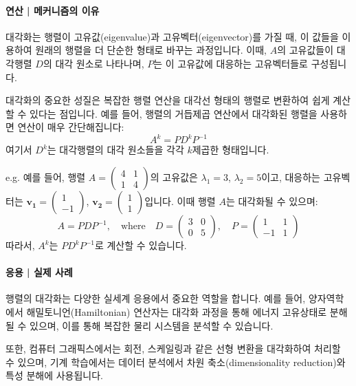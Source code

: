 \paragraph{연산 | 메커니즘의 이유}
대각화는 행렬이 고유값(eigenvalue)과 고유벡터(eigenvector)를 가질 때, 이 값들을 이용하여 원래의 행렬을 더 단순한 형태로 바꾸는 과정입니다. 이때, \( A \)의 고유값들이 대각행렬 \( D \)의 대각 원소로 나타나며, \( P \)는 이 고유값에 대응하는 고유벡터들로 구성됩니다.

\noindent 대각화의 중요한 성질은 복잡한 행렬 연산을 대각선 형태의 행렬로 변환하여 쉽게 계산할 수 있다는 점입니다. 예를 들어, 행렬의 거듭제곱 연산에서 대각화된 행렬을 사용하면 연산이 매우 간단해집니다:
\[
  A^k = P D^k P^{-1}
\]
여기서 \( D^k \)는 대각행렬의 대각 원소들을 각각 \(k\)제곱한 형태입니다.

\vspace{1\baselineskip}
\noindent {} e.g. 예를 들어, 행렬 \( A = \begin{pmatrix} 4 & 1 \\ 1 & 4 \end{pmatrix} \)의 고유값은 \( \lambda_1 = 3 \), \( \lambda_2 = 5 \)이고, 대응하는 고유벡터는 \( \mathbf{v_1} = \begin{pmatrix} 1 \\ -1 \end{pmatrix} \), \( \mathbf{v_2} = \begin{pmatrix} 1 \\ 1 \end{pmatrix} \)입니다. 이때 행렬 \( A \)는 대각화될 수 있으며:
\[
  A = P D P^{-1}, \quad \text{where} \quad D = \begin{pmatrix} 3 & 0 \\ 0 & 5 \end{pmatrix}, \quad P = \begin{pmatrix} 1 & 1 \\ -1 & 1 \end{pmatrix}
\]
따라서, \( A^k \)는 \( P D^k P^{-1} \)로 계산할 수 있습니다.

\paragraph{응용 | 실제 사례}
행렬의 대각화는 다양한 실세계 응용에서 중요한 역할을 합니다. 예를 들어, 양자역학에서 해밀토니언(Hamiltonian) 연산자는 대각화 과정을 통해 에너지 고유상태로 분해될 수 있으며, 이를 통해 복잡한 물리 시스템을 분석할 수 있습니다.

\noindent 또한, 컴퓨터 그래픽스에서는 회전, 스케일링과 같은 선형 변환을 대각화하여 처리할 수 있으며, 기계 학습에서는 데이터 분석에서 차원 축소(dimensionality reduction)와 특성 분해에 사용됩니다.




